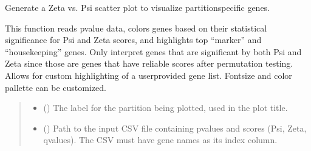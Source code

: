 \documentclass[letterpaper,10pt,english]{sphinxmanual}
\begin{document}

\begin{fulllineitems}
\label{\detokenize{ember_py:ember_py.plots.plot_partition_specificity}}
\pysigstartsignatures
\pysiglinewithargsret
{}
{\sphinxparamcomma {}\sphinxparamcomma {}\sphinxparamcomma {}\sphinxparamcomma {}\sphinxparamcomma {}\sphinxparamcomma {}}
{}
\pysigstopsignatures
\sphinxAtStartPar
Generate a Zeta vs. Psi scatter plot to visualize partition\sphinxhyphen{}specific genes.

\sphinxAtStartPar
This function reads p\sphinxhyphen{}value data, colors genes based on their statistical
significance for Psi and Zeta scores, and highlights top “marker” and
“housekeeping” genes. Only interpret genes that are significant by both Psi
and Zeta since those are genes that have reliable scores after permutation
testing.
Allows for custom highlighting of a user\sphinxhyphen{}provided gene list.
Fontsize and color pallette can be customized.
\begin{quote}\begin{description}
\begin{itemize}
\item {} 
\sphinxAtStartPar
{} (\sphinxstyleliteralemphasis{\sphinxupquote{, }}) \textendash{} The label for the partition being plotted, used in the plot title.

\item {} 
\sphinxAtStartPar
{} (\sphinxstyleliteralemphasis{\sphinxupquote{, }}) \textendash{} Path to the input CSV file containing p\sphinxhyphen{}values and scores (Psi, Zeta, q\sphinxhyphen{}values).
The CSV must have gene names as its index column.


\end{itemize}
\end{description}
\end{quote}
\end{fulllineitems}
\end{document}
